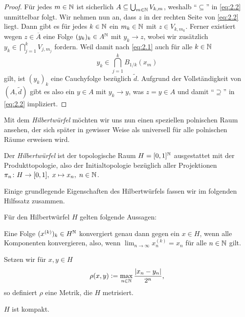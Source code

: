 \documentclass[../main/main.tex]{subfiles}
\begin{document}
\begin{proof}
		Für jedes $m \in \mathbb{N}$ ist sicherlich $A \subseteq 
		\bigcup_{m \in \mathbb{N}} V_{k, m}$, weshalb \enquote{$\subseteq$} 
		in \eqref{eq:2.2} unmittelbar folgt.
		Wir nehmen nun an, dass $z$ in der rechten Seite von \eqref{eq:2.2} liegt. 
		Dann gibt es für jedes $k \in \mathbb{N}$ ein $m_k \in \mathbb{N}$ mit $z \in V_{k, m_k}$. 
		Ferner existiert wegen $z \in \overline{A}$ eine Folge $(y_k)_k \in A^{\mathbb{N}}$ 
		mit $y_k \to z$, wobei wir zusätzlich
		$y_k \in \bigcap_{j=1}^{k} V_{j, m_j}$
		fordern. Weil damit nach \eqref{eq:2.1} auch für alle $k \in \mathbb{N}$
		\[y_k \in \bigcap_{j=1}^{k} B_{1/k}(x_m)\]
		gilt, ist $(y_k)_k$ eine Cauchyfolge bezüglich $\tilde{d}$. Aufgrund der Vollständigkeit von 
		$(A, \tilde{d})$ gibt es also ein $y \in A$ mit $y_k \to y$, was 
		$z = y \in A$ und damit \enquote{$\supseteq$} 
		in \eqref{eq:2.2} impliziert.
	\end{proof}
	
	Mit dem \emph{Hilbertwürfel} möchten wir uns nun einen speziellen polnischen Raum ansehen, 
	der sich später in gewisser Weise als universell für alle polnischen Räume erweisen wird.
	
	\begin{Definition}[Hilbertwürfel]
		Der \emph{Hilbertwürfel} ist der topologische Raum $H = [0, 1]^{\mathbb{N}}$ 
		ausgestattet mit der Produkttopologie, also der Initialtopologie bezüglich 
		aller Projektionen $\pi_n \colon H \to [0, 1], \; x \mapsto x_n , \; n \in \mathbb{N}$.
	\end{Definition}

	Einige grundlegende Eigenschaften des Hilbertwürfels fassen wir im folgenden Hilfssatz zusammen.
	
	\begin{Hilfssatz}
		\label{lem:hilbertcube}
		Für den Hilbertwürfel $H$ gelten folgende Aussagen:
		\begin{enumeratethm}
			\item Eine Folge $(x^{(k)})_k \in H^{\mathbb{N}}$ konvergiert genau dann gegen 
			ein $x \in H$, wenn alle Komponenten konvergieren, also, wenn
			$\lim_{n \to \infty} x_n^{(k)} = x_n$ für alle $n \in \mathbb{N}$ gilt.
			\item Setzen wir für $x, y \in H$
			$$\rho(x, y) \vcentcolon = \max_{n \in \mathbb{N}} \frac{|x_n - y_n|}{2^n} \text{,}$$
			so definiert $\rho$ eine Metrik, die $H$ metrisiert.
			\item $H$ ist kompakt.
		\end{enumeratethm}
	\end{Hilfssatz}
	
\end{document}

